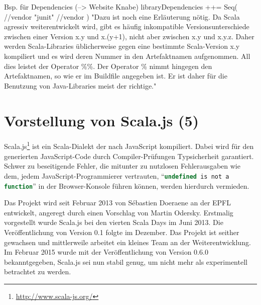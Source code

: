 \documentclass[a4paper, 12pt, hidelinks, listof=totoc, listoftables=totoc, bibliography=totoc]{scrreprt}
\newcommand{\js}[1]{\lstinline[language=JavaScript, style=inline]|#1|}
\begin{document}
Bsp. für Dependencies (-->  Website Knabe)
	libraryDependencies ++= Seq(
       //vendor %
       "junit" %
       //vendor %
    )
    "Dazu ist noch eine Erläuterung nötig. Da Scala agressiv weiterentwickelt wird, gibt es häufig inkompatible Versionsunterschiede zwischen einer Version x.y und x.(y+1), nicht aber zwischen x.y und x.y.z. Daher werden Scala-Libraries üblicherweise gegen eine bestimmte Scala-Version x.y kompiliert und es wird deren Nummer in den Artefaktnamen aufgenommen. All dies leistet der Operator \%\%. Der Operator \% nimmt hingegen den Artefaktnamen, so wie er im Buildfile angegeben ist. Er ist daher für die Benutzung von Java-Libraries meist der richtige."



























\chapter{Vorstellung von Scala.js (5)}



Scala.js\footnote{\url{http://www.scala-js.org/}} ist ein Scala-Dialekt der nach JavaScript kompiliert\cite[S. 1]{doeraene2013.TDI}. Dabei wird für den generierten JavaScript-Code durch Compiler-Prüfungen Typsicherheit garantiert. Schwer zu beseitigende Fehler, die mitunter zu nutzlosen Fehlerausgaben wie dem, jedem JavaScript-Programmierer vertrauten, "`\js{undefined is not a function}"' in der Browser-Konsole führen können, werden hierdurch vermieden.

Das Projekt wird seit Februar 2013 von Sébastien Doeraene an der EPFL entwickelt, angeregt durch einen Vorschlag von Martin Odersky.\cite{doeraene2013.CSJ} Erstmalig vorgestellt wurde Scala.js bei den vierten Scala Days im Juni 2013. Die Veröffentlichung von Version 0.1 folgte im Dezember. Das Projekt ist seither gewachsen und mittlerweile arbeitet ein kleines Team an der Weiterentwicklung. Im Februar 2015 wurde mit der Veröffentlichung von Version 0.6.0 bekanntgegeben, Scala.js sei nun stabil genug, um nicht mehr als experimentell betrachtet zu werden.\cite{doeraene2015.SNL}
\end{document}
